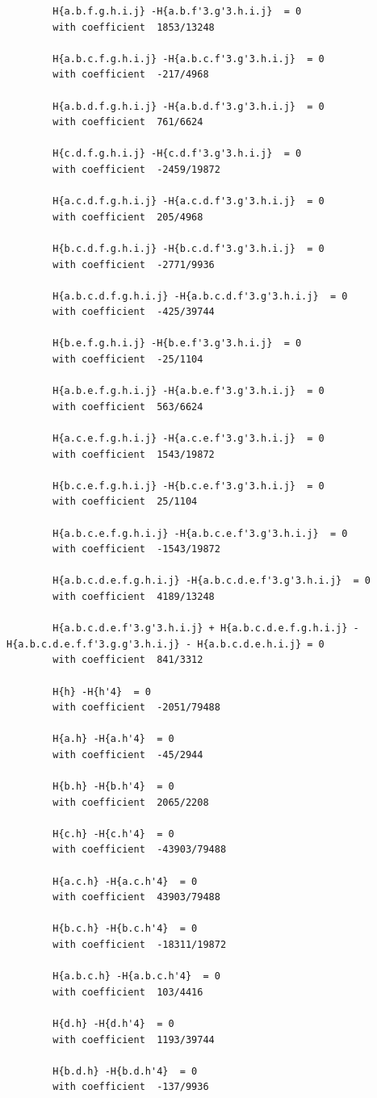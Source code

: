 \documentclass[11pt, a4paper]{kybernetika}
\begin{document}
\begin{verbatim}
		H{a.b.f.g.h.i.j} -H{a.b.f'3.g'3.h.i.j}  = 0
		with coefficient  1853/13248
		
		H{a.b.c.f.g.h.i.j} -H{a.b.c.f'3.g'3.h.i.j}  = 0
		with coefficient  -217/4968
		
		H{a.b.d.f.g.h.i.j} -H{a.b.d.f'3.g'3.h.i.j}  = 0
		with coefficient  761/6624
		
		H{c.d.f.g.h.i.j} -H{c.d.f'3.g'3.h.i.j}  = 0
		with coefficient  -2459/19872
		
		H{a.c.d.f.g.h.i.j} -H{a.c.d.f'3.g'3.h.i.j}  = 0
		with coefficient  205/4968
		
		H{b.c.d.f.g.h.i.j} -H{b.c.d.f'3.g'3.h.i.j}  = 0
		with coefficient  -2771/9936
		
		H{a.b.c.d.f.g.h.i.j} -H{a.b.c.d.f'3.g'3.h.i.j}  = 0
		with coefficient  -425/39744
		
		H{b.e.f.g.h.i.j} -H{b.e.f'3.g'3.h.i.j}  = 0
		with coefficient  -25/1104
		
		H{a.b.e.f.g.h.i.j} -H{a.b.e.f'3.g'3.h.i.j}  = 0
		with coefficient  563/6624
		
		H{a.c.e.f.g.h.i.j} -H{a.c.e.f'3.g'3.h.i.j}  = 0
		with coefficient  1543/19872
		
		H{b.c.e.f.g.h.i.j} -H{b.c.e.f'3.g'3.h.i.j}  = 0
		with coefficient  25/1104
		
		H{a.b.c.e.f.g.h.i.j} -H{a.b.c.e.f'3.g'3.h.i.j}  = 0
		with coefficient  -1543/19872
		
		H{a.b.c.d.e.f.g.h.i.j} -H{a.b.c.d.e.f'3.g'3.h.i.j}  = 0
		with coefficient  4189/13248
		
		H{a.b.c.d.e.f'3.g'3.h.i.j} + H{a.b.c.d.e.f.g.h.i.j} - H{a.b.c.d.e.f.f'3.g.g'3.h.i.j} - H{a.b.c.d.e.h.i.j} = 0
		with coefficient  841/3312
		
		H{h} -H{h'4}  = 0
		with coefficient  -2051/79488
		
		H{a.h} -H{a.h'4}  = 0
		with coefficient  -45/2944
		
		H{b.h} -H{b.h'4}  = 0
		with coefficient  2065/2208
		
		H{c.h} -H{c.h'4}  = 0
		with coefficient  -43903/79488
		
		H{a.c.h} -H{a.c.h'4}  = 0
		with coefficient  43903/79488
		
		H{b.c.h} -H{b.c.h'4}  = 0
		with coefficient  -18311/19872
		
		H{a.b.c.h} -H{a.b.c.h'4}  = 0
		with coefficient  103/4416
		
		H{d.h} -H{d.h'4}  = 0
		with coefficient  1193/39744
		
		H{b.d.h} -H{b.d.h'4}  = 0
		with coefficient  -137/9936
		

\end{verbatim}
\end{document}
